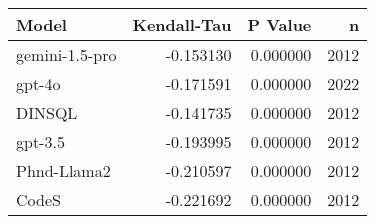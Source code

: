 \begin{tabular}{lrrr}
\toprule
Model & Kendall-Tau & P Value & n \\
\midrule
gemini-1.5-pro & -0.153130 & 0.000000 & 2012 \\
gpt-4o & -0.171591 & 0.000000 & 2022 \\
DINSQL & -0.141735 & 0.000000 & 2012 \\
gpt-3.5 & -0.193995 & 0.000000 & 2012 \\
Phnd-Llama2 & -0.210597 & 0.000000 & 2012 \\
CodeS & -0.221692 & 0.000000 & 2012 \\
\bottomrule
\end{tabular}
